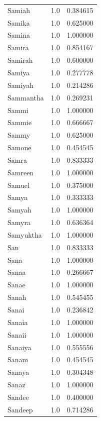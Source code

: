 \documentclass[
  letterpaper,
  DIV=11,
  numbers=noendperiod]{scrreprt}
\begin{document}
\begin{tabular}{lrr}
Samiah          &   1.0 &   0.384615 \\
Samika          &   1.0 &   0.625000 \\
Samina          &   1.0 &   1.000000 \\
Samira          &   1.0 &   0.854167 \\
Samirah         &   1.0 &   0.600000 \\
Samiya          &   1.0 &   0.277778 \\
Samiyah         &   1.0 &   0.214286 \\
Sammantha       &   1.0 &   0.269231 \\
Sammi           &   1.0 &   1.000000 \\
Sammie          &   1.0 &   0.666667 \\
Sammy           &   1.0 &   0.625000 \\
Samone          &   1.0 &   0.454545 \\
Samra           &   1.0 &   0.833333 \\
Samreen         &   1.0 &   1.000000 \\
Samuel          &   1.0 &   0.375000 \\
Samya           &   1.0 &   0.333333 \\
Samyah          &   1.0 &   1.000000 \\
Samyra          &   1.0 &   0.636364 \\
Samyuktha       &   1.0 &   1.000000 \\
San             &   1.0 &   0.833333 \\
Sana            &   1.0 &   1.000000 \\
Sanaa           &   1.0 &   0.266667 \\
Sanae           &   1.0 &   1.000000 \\
Sanah           &   1.0 &   0.545455 \\
Sanai           &   1.0 &   0.236842 \\
Sanaia          &   1.0 &   1.000000 \\
Sanaii          &   1.0 &   1.000000 \\
Sanaiya         &   1.0 &   0.555556 \\
Sanam           &   1.0 &   0.454545 \\
Sanaya          &   1.0 &   0.304348 \\
Sanaz           &   1.0 &   1.000000 \\
Sandee          &   1.0 &   0.400000 \\
Sandeep         &   1.0 &   0.714286 \\

\end{tabular}
\end{document}

